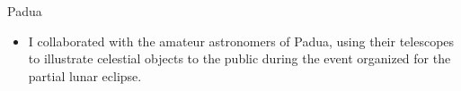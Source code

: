 %
%
%


\begin{experiences}
     {Padua}{
     \begin{itemize}
         \item I collaborated with the amateur astronomers of Padua, using their telescopes to illustrate celestial objects to the public during the event organized for the partial lunar eclipse.
     \end{itemize}}
\end{experiences}